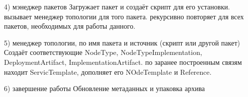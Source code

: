 4) мэнеджер пакетов
Загружает пакет и создаёт скрипт для его установки. вызывает менеджер топологии для того пакета. рекурсивно повторяет для всех пакетов, необходимых для работы данного. 

5) менеджер топологии, по имя пакета и источник (скрипт или другой пакет) 
Создаёт соответствующие NodeType, NodeTypeImplementation, DeploymentArtifact, ImplementationArtifact. 
по заранее построенным связям находит ServicTemplate, дополняет его NOdeTemplate и Reference. 

6) завершение работы
Обновление метаданных и упаковка архива
	
\fi

